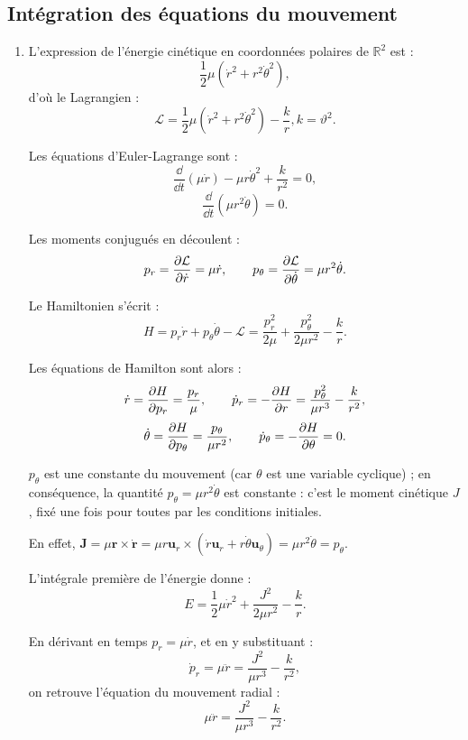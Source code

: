 \documentclass[a4paper,10pt]{report}
\begin{document}
\subsection{Intégration des équations du mouvement}

\begin{enumerate}
	 \item
	 
	 L'expression de l'énergie cinétique en coordonnées polaires de $\mathbb{R}^2$ est :
	 \[
	 \frac{1}{2} \mu (\dot{r}^2 + r^2 \dot{\theta}^2),
	 \]
	 d'où le Lagrangien :
	 \[
	 \mathcal{L} = \frac{1}{2} \mu (\dot{r}^2 + r^2 \dot{\theta}^2) - \frac{k}{r}, k = \vartheta^2.
	 \]
	 
	 Les équations d'Euler-Lagrange sont :
	 \[
	 \frac{\dd}{\dd t} \left( \mu \dot{r} \right) - \mu r \dot{\theta}^2 + \frac{k}{r^2} = 0,
	 \]
	 \[
	 \frac{\dd}{\dd t} \left( \mu r^2 \dot{\theta} \right) = 0.
	 \]
	 
	 Les moments conjugués en découlent :
	 \[
	 p_r = \pdv{\mathcal{L}}{\dot{r}} = \mu \dot{r}, \qquad p_\theta = \pdv{\mathcal{L}}{\dot{\theta}} = \mu r^2 \dot{\theta}.
	 \]
	 
	 Le Hamiltonien s'écrit :
	 \[
	 H = p_r \dot{r} + p_\theta \dot{\theta} - \mathcal{L} = \frac{p_r^2}{2\mu} + \frac{p_\theta^2}{2\mu r^2} - \frac{k}{r}.
	 \]
	 
	 Les équations de Hamilton sont alors :
	 \[
	 \dot{r} = \pdv{H}{p_r} = \frac{p_r}{\mu}, \qquad \dot{p}_r = -\pdv{H}{r} = \frac{p_\theta^2}{\mu r^3} - \frac{k}{r^2},
	 \]
	 \[
	 \dot{\theta} = \pdv{H}{p_\theta} = \frac{p_\theta}{\mu r^2}, \qquad \dot{p}_\theta = -\pdv{H}{\theta} = 0.
	 \]
	 
	 $p_\theta$ est une constante du mouvement (car $\theta$ est une variable cyclique) ; en conséquence, la quantité $p_\theta = \mu r^2 \dot{\theta}$ est constante : c'est le moment cinétique $J$, fixé une fois pour toutes par les conditions initiales.
	 
	 \medskip
	 
	 En effet, $\textbf{J} = \mu \textbf{r} \times \dot{\textbf{r}} = \mu r \textbf{u}_r \times ( \dot{r} \textbf{u}_r + r \dot{\theta} \textbf{u}_\theta ) = \mu r^2 \dot{\theta} = p_\theta$.
	 
	 \medskip
	 
	 L'intégrale première de l'énergie donne :
	 \[
	 E = \frac{1}{2} \mu \dot{r}^2 + \frac{J^2}{2\mu r^2} - \frac{k}{r}.
	 \]
	 
	 En dérivant en temps $p_r = \mu \dot{r}$, et en y substituant :
	 \[
	 \dot{p}_r = \mu \ddot{r} = \frac{J^2}{\mu r^3} - \frac{k}{r^2},
	 \]
	 on retrouve l'équation du mouvement radial :
	 \begin{equation}
	 	\mu \ddot{r} = \frac{J^2}{\mu r^3} - \frac{k}{r^2}. \tag{7.25}
	 \end{equation}
	 

\end{enumerate}
\end{document}
